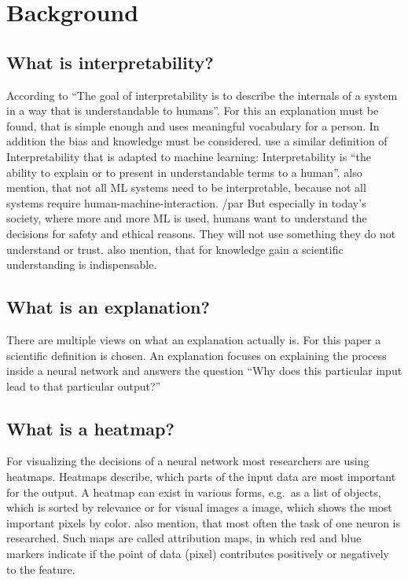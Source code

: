 \section{Background}

\subsection{What is interpretability?}
According to  “The goal of interpretability is to describe the internals of a system in a way that is understandable to humans”. For this an explanation must be found, that is simple enough and uses meaningful vocabulary for a person. In addition the bias and knowledge must be considered.
 use a similar definition of Interpretability that is adapted to machine learning: Interpretability is “the ability to explain or to present in understandable terms to a human”.  also mention, that not all ML systems need to be interpretable, because not all systems require human-machine-interaction. 
/par
But especially in today's society, where more and more ML is used, humans want to understand the decisions for safety and ethical reasons. They will not use something they do not understand or trust.
 also mention, that for knowledge gain a scientific understanding is indispensable.

\subsection{What is an explanation?}
There are multiple views on what an explanation actually is. For this paper a scientific definition is chosen. An explanation focuses on explaining the process inside a neural network and answers the question “Why does this particular input lead to that particular output?”~\cite[2]{Gilpin.2018}

\subsection{What is a heatmap?} 
For visualizing the decisions of a neural network most researchers are using heatmaps. Heatmaps describe, which parts of the input data are most important for the output. A heatmap can exist in various forms, e.g.\ as a list of objects, which is sorted by relevance or for visual images a image, which shows the most important pixels by color. \Cite{Acona.2018} also mention, that most often the task of one neuron is researched. Such maps are called attribution maps, in which red and blue markers indicate if the point of data (pixel) contributes positively or negatively to the feature.
